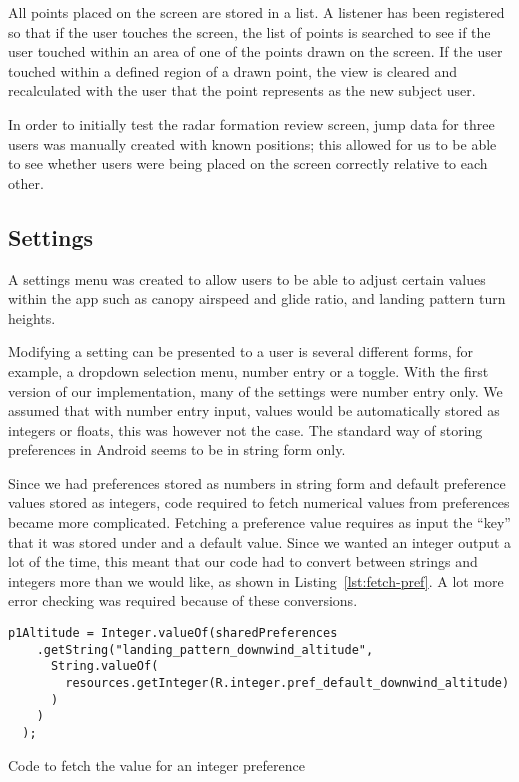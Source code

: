 All points placed on the screen are stored in a list. A listener has been registered so that if the user touches the screen, the list of points is searched to see if the user touched within an area of one of the points drawn on the screen. If the user touched within a defined region of a drawn point, the view is cleared and recalculated with the user that the point represents as the new subject user.

In order to initially test the radar formation review screen, jump data for three users was manually created with known positions; this allowed for us to be able to see whether users were being placed on the screen correctly relative to each other.

\subsection{Settings}
A settings menu was created to allow users to be able to adjust certain values within the app such as canopy airspeed and glide ratio, and landing pattern turn heights.

Modifying a setting can be presented to a user is several different forms, for example, a dropdown selection menu, number entry or a toggle. With the first version of our implementation, many of the settings were number entry only. We assumed that with number entry input, values would be automatically stored as integers or floats, this was however not the case. The standard way of storing preferences in Android seems to be in string form only.

Since we had preferences stored as numbers in string form and default preference values stored as integers, code required to fetch numerical values from preferences became more complicated.
Fetching a preference value requires as input the ``key'' that it was stored under and a default value. Since we wanted an integer output a lot of the time, this meant that our code had to convert between strings and integers more than we would like, as shown in Listing~\ref{lst:fetch-pref}. A lot more error checking was required because of these conversions.

\begin{listing}
  \centering
  \begin{verbatim}
p1Altitude = Integer.valueOf(sharedPreferences
    .getString("landing_pattern_downwind_altitude",
      String.valueOf(
        resources.getInteger(R.integer.pref_default_downwind_altitude)
      )
    )
  );
  \end{verbatim}
  \caption{Code to fetch the value for an integer preference}\label{lst:fetch-pref}
\end{listing}

